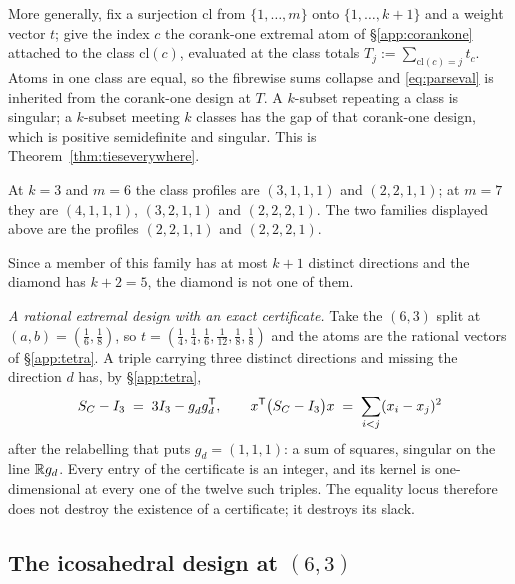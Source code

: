 More generally, fix a surjection $\mathrm{cl}$ from $\{1,\dots,m\}$ onto
$\{1,\dots,k+1\}$ and a weight vector $t$; give the index $c$ the corank-one
extremal atom of \S\ref{app:corankone} attached to the class
$\mathrm{cl}(c)$, evaluated at the class totals
$T_j:=\sum_{\mathrm{cl}(c)=j}t_c$.  Atoms in one class are equal, so the
fibrewise sums collapse and \eqref{eq:parseval} is inherited from the
corank-one design at $T$.  A $k$-subset repeating a class is singular; a
$k$-subset meeting $k$ classes has the gap of that corank-one design, which is
positive semidefinite and singular.  This is
Theorem~\ref{thm:tieseverywhere}.

At $k=3$ and $m=6$ the class profiles are $(3,1,1,1)$ and $(2,2,1,1)$; at
$m=7$ they are $(4,1,1,1)$, $(3,2,1,1)$ and $(2,2,2,1)$.  The two families
displayed above are the profiles $(2,2,1,1)$ and $(2,2,2,1)$.

Since a member of this family has at most $k+1$ distinct directions and the
diamond has $k+2=5$, the diamond is not one of them.

\emph{A rational extremal design with an exact certificate.}  Take the $(6,3)$
split at $(a,b)=(\tfrac16,\tfrac18)$, so
$t=(\tfrac14,\tfrac14,\tfrac16,\tfrac1{12},\tfrac18,\tfrac18)$ and the atoms
are the rational vectors of \S\ref{app:tetra}.  A triple carrying three
distinct directions and missing the direction $d$ has, by \S\ref{app:tetra},
\[
  \SC-I_3\;=\;3I_3-g_d^{\vphantom{\mathsf{T}}}g_d\tp,
  \qquad
  x\tp\bigl(\SC-I_3\bigr)x\;=\;\sum_{i<j}(x_i-x_j)^{2}
\]
after the relabelling that puts $g_d=(1,1,1)$: a sum of squares, singular on
the line $\mathbb{R} g_d$.  Every entry of the certificate is an integer, and its
kernel is one-dimensional at every one of the twelve such triples.  The
equality locus therefore does not destroy the existence of a certificate; it
destroys its slack.

\subsection{The icosahedral design at
\texorpdfstring{$(6,3)$}{(6,3)}}\label{app:icosa}

